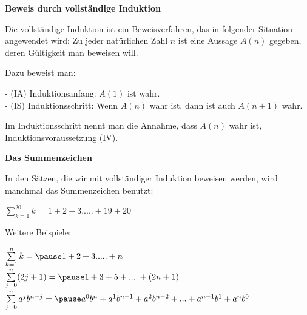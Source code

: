 \begin{frame}[fragile]

\textbf{Beweis durch vollständige Induktion}

 Die vollständige Induktion ist ein Beweisverfahren, das in folgender Situation angewendet wird: 
 Zu jeder natürlichen Zahl $n$ ist eine Aussage
$A(n)$ gegeben, deren Gültigkeit man beweisen will. \pause

Dazu beweist man:

- (IA) Induktionsanfang: $A(1)$ ist wahr. \\ \pause
- (IS) Induktionsschritt: Wenn $A(n)$ wahr ist, dann ist auch $A(n+1)$ wahr. \pause

Im Induktionsschritt nennt man die Annahme, dass $A(n)$ wahr ist, Induktionsvoraussetzung (IV).

\end{frame}


\begin{frame}[fragile]

\textbf{Das Summenzeichen}

In den Sätzen, die wir mit vollständiger Induktion beweisen werden, wird manchmal das Summenzeichen benutzt:

$\sum\limits_{k=1}^{20}k$ \pause =  $1 + 2 + 3 ..... + 19 + 20$  \pause
 

Weitere Beispiele:

$\sum\limits_{k=1}^{n}k = \pause 1 + 2 + 3 ..... + n$  \\ 

$\sum\limits_{j=0}^n (2j+1) = \pause 1 + 3+ 5 + .... + (2n+1)$\\

$\sum\limits_{j=0}^n a^j b^{n-j} = \pause a^0b^n+a^1b^{n-1}+a^2b^{n-2} + ... + a^{n-1}b^1+a^nb^0$
\end{frame}


